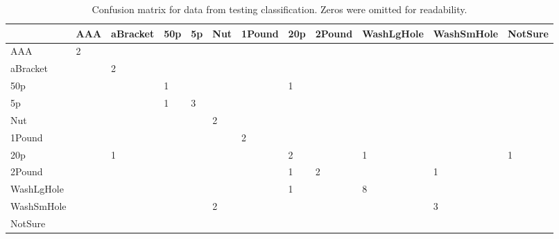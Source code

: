 \documentclass[12pt]{article}
\begin{document}
\begin{table}
	\centering
	\caption{Confusion matrix for data from testing classification. Zeros were omitted for readability.}
	\label{tab:conf}
	\begin{tabular}{l|l|l|l|l|l|l|l|l|l|l|l}
					& AAA & aBracket & 50p & 5p & Nut & 1Pound & 20p & 2Pound & WashLgHole & WashSmHole & NotSure \\ \hline
		AAA 		& 2   &          &     & 	&     & 	   &     &        &            &            & 		  \\ \hline
		aBracket 	&     & 2        &     &  	&     & 	   &     &        &            &            &		  \\ \hline
		50p 		&     &          & 1   & 	&     & 	   & 1   &        &            &            &		  \\ \hline
		5p 			&     &          & 1   & 3	&     & 	   &     &        &            &            &		  \\ \hline
		Nut 		&     &      	 &     & 	& 2   & 	   &     &        &            &            &		  \\ \hline
		1Pound 		&     & 		 &     & 	&     & 2	   &     &        &            &            &		  \\ \hline
		20p		 	&     & 1		 &     & 	&     & 	   & 2   &        & 1          &            & 1		  \\ \hline
		2Pound 		&     & 		 &     & 	&     & 	   & 1   & 2      &            & 1          &		  \\ \hline
		WashLgHole 	&     & 		 &     & 	&     & 	   & 1   &        & 8          &            &		  \\ \hline
		WashSmHole 	&     & 		 &     & 	& 2   & 	   &     &        &            & 3          &		  \\ \hline
		NotSure 	&     & 		 &     & 	&     & 	   &     &        &            &            &		  
	\end{tabular}
\end{table}
\end{document}
